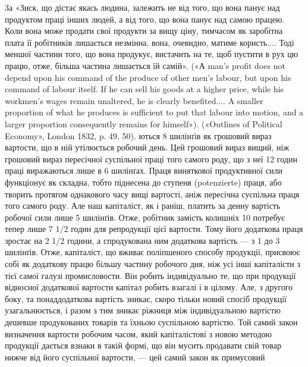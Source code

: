 3а «Зиск, що дістає якась людина, залежить не від того, що вона
панує над продуктом праці інших людей, а від того, що вона панує над
самою працею. Коли вона може продати свої продукти за вищу ціну, тимчасом
як заробітна плата її робітників лишається незмінна, вона, очевидно,
матиме користь.... Тоді меншої частини того, що вона продукує, вистачить
на те, щоб пустити в рух цю працю, отже, більша частина лишається їй
самій». («А man’s profit does not depend upon his command of the produce
of other men’s labour, but upon his command of labour itself. If he can sell
his goods at a higher price, while his workmen's wages remain unaltered,
he is clearly benefited.... A smaller proportion of what he produces is sufficient
to put that labour into motion, and a larger proportion consequently
remains for himself»). («Outlines of Political Economy», London 1832,
p. 49, 50).
ються 8 шилінґів як грошовий вираз вартости, що в ній утілюється робочий день. Цей грошовий вираз
вищий, ніж грошовий
вираз пересічної суспільної праці того самого роду, що з неї
12 годин праці виражаються лише в 6 шилінґах. Праця виняткової продуктивної сили функціонує як
складна, тобто піднесена
до ступеня (potenzierte) праця, або творить протягом однакового
часу вищі вартості, аніж пересічна суспільна праця того самого
роду. Але наш капіталіст, як і раніш, платить за денну вартість
робочої сили лише 5 шилінґів. Отже, робітник замість колишніх
10 потребує тепер лише 7 1/2 годин для репродукції цієї вартости.
Тому його додаткова праця зростає на 2 1/2 години, а спродукована
ним додаткова вартість — з 1 до 3 шилінґів. Отже, капіталіст,
що вживає поліпшеного способу продукції, присвоює собі як додаткову працю більшу частину робочого
дня, ніж усі інші капіталісти
з тієї самої галузі промисловости. Він робить індивідуально те,
що при продукції відносної додаткової вартости капітал робить
взагалі і в цілому. Але, з другого боку, та понаддодаткова вартість
зникає, скоро тільки новий спосіб продукції узагальнюється, і
разом з тим зникає ріжниця між індивідуальною вартістю дешевше
продукованих товарів та їхньою суспільною вартістю. Той самий
закон визначення вартости робочим часом, який капіталістові
з новою методою продукції дається взнаки в такій формі, що він
мусить продавати свій товар нижче від його суспільної вартости, — цей самий закон як примусовий
